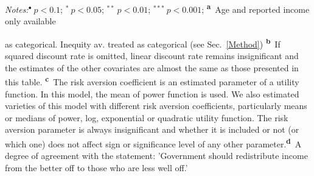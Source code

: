 \documentclass[a4paper,12pt]{article}
\begin{document}
{\begin{threeparttable}
\begin{tablenotes}
\begin{footnotesize}
 \item \textit{Notes:}\hspace{0.2cm}$^{\bullet}~p<0.1$; $^{*}~p<0.05$; $^{**}~p<0.01$; $^{***}~p<0.001$;\hspace{0.4cm} 
  \vspace{-0.4cm}\large{\textsuperscript{\textbf{a}}}~\footnotesize{Age and reported income only available}\\ \begin{adjustwidth}{0.7cm}{} \footnotesize{as  categorical. Inequity av. treated as categorical (see Sec.~\ref{Method})\hspace{0.4cm}} 
  \large{\textsuperscript{\textbf{b}}}~\footnotesize{If squared discount rate is omitted, linear discount rate remains insignificant and the estimates of the other covariates are almost the same as those presented in this table.\hspace{0.4cm}} 
  \large{\textsuperscript{\textbf{c}}}~\footnotesize{The risk aversion coefficient is an estimated parameter of a utility function. In this model, the mean of power function is used. We also estimated varieties of this model with different risk aversion coefficients, particularly means or medians of power, log, exponential or quadratic utility function. The risk aversion parameter is always insignificant and whether it is included or not (or which one) does not affect sign or significance level of any other parameter.\hspace{0.4cm}}\normalsize{\textsuperscript{\textbf{d}}}~\footnotesize{A degree of agreement with the statement: 'Government should redistribute income from the better off to those who are less well off.'}
     \end{adjustwidth}     
\singlespacing
  \end{footnotesize}
\end{tablenotes}
  \end{threeparttable} 
\par}

\pagebreak
\end{document}
